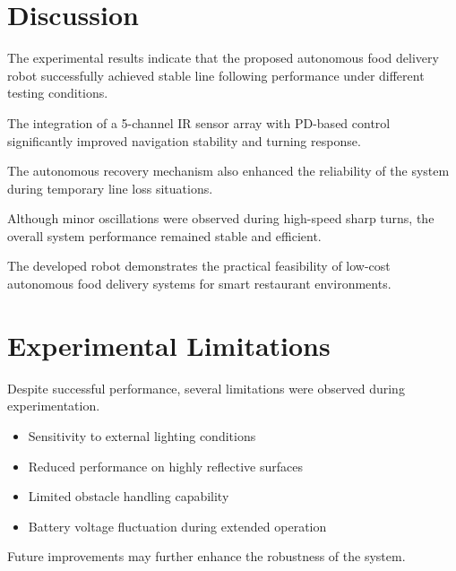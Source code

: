 \documentclass[12pt,a4paper,oneside]{report}
\begin{document}

\section{Discussion}

The experimental results indicate that the proposed autonomous food delivery robot successfully achieved stable line following performance under different testing conditions.

The integration of a 5-channel IR sensor array with PD-based control significantly improved navigation stability and turning response.

The autonomous recovery mechanism also enhanced the reliability of the system during temporary line loss situations.

Although minor oscillations were observed during high-speed sharp turns, the overall system performance remained stable and efficient.

The developed robot demonstrates the practical feasibility of low-cost autonomous food delivery systems for smart restaurant environments.


\section{Experimental Limitations}

Despite successful performance, several limitations were observed during experimentation.

\begin{itemize}

\item Sensitivity to external lighting conditions

\item Reduced performance on highly reflective surfaces

\item Limited obstacle handling capability

\item Battery voltage fluctuation during extended operation

\end{itemize}

Future improvements may further enhance the robustness of the system.
\end{document}
